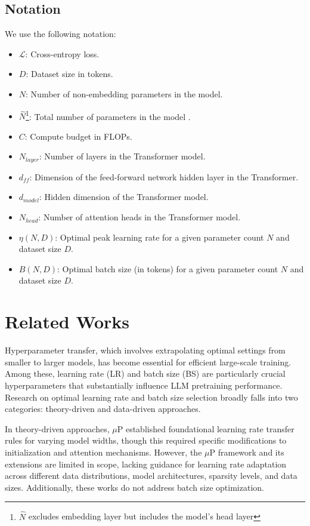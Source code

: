 \documentclass[11pt]{article}
\begin{document}
    \subsection{Notation}
    \label{sec:notation}
    We use the following notation:
    \begin{itemize}
    \item $\mathcal{L}$: Cross-entropy loss.
    \item $D$: Dataset size in tokens.
    \item $N$: Number of non-embedding parameters in the model.
    \item $\hat{N}$\footnote{$\hat{N}$ excludes embedding layer but includes the model’s head layer}: Total number of parameters in the model .
    \item $C$: Compute budget in FLOPs.
    \item $N_{{layer}}$: Number of layers in the Transformer model.
    \item $d_{ff}$: Dimension of the feed-forward network hidden layer in the Transformer.
    \item $d_{{model}}$: Hidden dimension of the Transformer model.
    \item $N_{{head}}$: Number of attention heads in the Transformer model.
    \item $\eta(N, D)$: Optimal peak learning rate for a given parameter count $N$ and dataset size $D$.
    \item $B(N, D)$: Optimal batch size (in tokens)  for a given parameter count $N$ and dataset size $D$.
    \end{itemize}

    
    \section{Related Works}

    Hyperparameter transfer, which involves extrapolating optimal settings from smaller
    to larger models, has become essential for efficient large-scale training. Among
    these, learning rate (LR) and batch size (BS) are particularly crucial
    hyperparameters that substantially influence LLM pretraining performance\cite{Halfon2024}. Research on optimal learning rate and batch size selection broadly falls into two categories: theory-driven and data-driven approaches.

    In theory-driven approaches, $\mu \text{P}$ \cite{Yang2022}
    established foundational learning rate transfer rules for varying model
    widths, though this required specific modifications to initialization and attention
    mechanisms. However, the $\mu \text{P}$ framework and its extensions \cite{Yang2022,Everett2024,Lingle2024,Blake2024,Yang2023,Bordelon2023}
    are limited in scope, lacking guidance for learning rate adaptation across different
    data distributions, model architectures, sparsity levels, and data sizes. Additionally,
    these works do not address batch size optimization.
\end{document}
